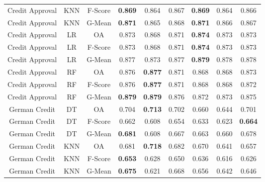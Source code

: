 \begin{longtable}{ccccccccc}
   Credit Approval &        KNN & F-Score & \textbf{0.869} &          0.864 &          0.867 & \textbf{0.869} &          0.864 &          0.866 \\
   Credit Approval &        KNN &  G-Mean & \textbf{0.871} &          0.865 &          0.868 & \textbf{0.871} &          0.866 &          0.867 \\
   Credit Approval &         LR &      OA &          0.873 &          0.868 &          0.871 & \textbf{0.874} &          0.873 &          0.873 \\
   Credit Approval &         LR & F-Score &          0.873 &          0.868 &          0.871 & \textbf{0.874} &          0.873 &          0.873 \\
   Credit Approval &         LR &  G-Mean &          0.877 &          0.873 &          0.877 & \textbf{0.879} &          0.878 &          0.878 \\
   Credit Approval &         RF &      OA &          0.876 & \textbf{0.877} &          0.871 &          0.868 &          0.868 &          0.873 \\
   Credit Approval &         RF & F-Score &          0.876 & \textbf{0.877} &          0.871 &          0.868 &          0.868 &          0.872 \\
   Credit Approval &         RF &  G-Mean & \textbf{0.879} & \textbf{0.879} &          0.876 &          0.872 &          0.873 &          0.875 \\
     German Credit &         DT &      OA &          0.704 & \textbf{0.713} &          0.702 &          0.660 &          0.644 &          0.701 \\
     German Credit &         DT & F-Score &          0.662 &          0.608 &          0.654 &          0.633 &          0.623 & \textbf{0.664} \\
     German Credit &         DT &  G-Mean & \textbf{0.681} &          0.608 &          0.667 &          0.663 &          0.660 &          0.678 \\
     German Credit &        KNN &      OA &          0.681 & \textbf{0.718} &          0.682 &          0.670 &          0.641 &          0.657 \\
     German Credit &        KNN & F-Score & \textbf{0.653} &          0.628 &          0.650 &          0.636 &          0.616 &          0.626 \\
     German Credit &        KNN &  G-Mean & \textbf{0.675} &          0.621 &          0.668 &          0.656 &          0.642 &          0.646 \\

\end{longtable}
